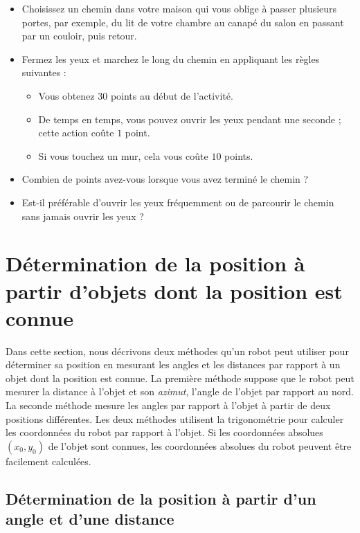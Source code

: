 \begin{framed}
\begin{itemize}
\item Choisissez un chemin dans votre maison qui vous oblige à passer plusieurs portes, par exemple, du lit de votre chambre au canapé du salon en passant par un couloir, puis retour.
\item Fermez les yeux et marchez le long du chemin en appliquant les règles suivantes :
\begin{itemize}
\item Vous obtenez $30$ points au début de l'activité.
\item De temps en temps, vous pouvez ouvrir les yeux pendant une seconde ; cette action coûte $1$ point.
\item Si vous touchez un mur, cela vous coûte $10$ points.
\end{itemize}
\item Combien de points avez-vous lorsque vous avez terminé le chemin ?
\item Est-il préférable d'ouvrir les yeux fréquemment ou de parcourir le chemin sans jamais ouvrir les yeux ?
\end{itemize}
\end{framed}

\section[Objets dont la position est connue]{Détermination de la position à partir d'objets dont la position est connue}\label{s.known-points}

Dans cette section, nous décrivons deux méthodes qu'un robot peut utiliser pour déterminer sa position en mesurant les angles et les distances par rapport à un objet dont la position est connue. La première méthode suppose que le robot peut mesurer la distance à l'objet et son \emph{azimut}, l'angle de l'objet par rapport au nord. La seconde méthode mesure les angles par rapport à l'objet à partir de deux positions différentes. Les deux méthodes utilisent la trigonométrie pour calculer les coordonnées du robot par rapport à l'objet. Si les coordonnées absolues $(x_0,y_0)$ de l'objet sont connues, les coordonnées absolues du robot peuvent être facilement calculées.

\subsection{Détermination de la position à partir d'un angle et d'une distance}

